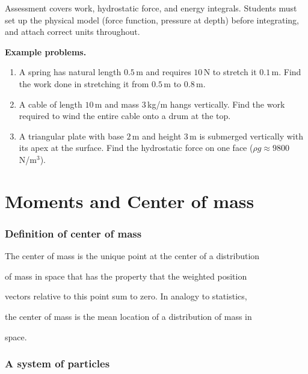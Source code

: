 Assessment covers work, hydrostatic force, and energy integrals. Students must set up the physical model (force function, pressure at depth) before integrating, and attach correct units throughout.

\textbf{Example problems.}

\begin{enumerate}
    \item A spring has natural length $0.5$\,m and requires $10$\,N to stretch it $0.1$\,m. Find the work done in stretching it from $0.5$\,m to $0.8$\,m.
    \item A cable of length $10$\,m and mass $3$\,kg/m hangs vertically. Find the work required to wind the entire cable onto a drum at the top.
    \item A triangular plate with base $2$\,m and height $3$\,m is submerged vertically with its apex at the surface. Find the hydrostatic force on one face ($\rho g \approx 9800$\,N/m$^3$).
\end{enumerate}

\section{Moments and Center of mass}
\label{sec:mome-3593}


\subsubsection{Definition of center of mass}
\label{sss:defi-7289}


The center of mass is the unique point at the center of a distribution

of mass in space that has the property that the weighted position

vectors relative to this point sum to zero. In analogy to statistics,

the center of mass is the mean location of a distribution of mass in

space.


\subsubsection{A system of particles}
\label{sss:asys-cc14}


